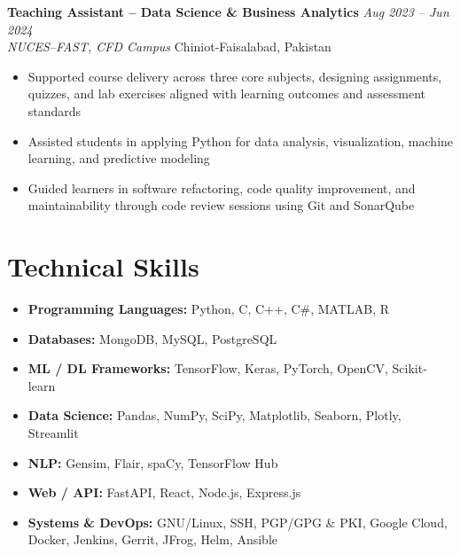 \documentclass[11pt,a4paper]{article}
\newcommand{\entry}[4]{%
  \noindent\textbf{#1} \hfill \textit{#2}\\
  \textit{#3} \hfill #4\\[2pt]
}
\begin{document}
\vspace{4pt}
\entry{Teaching Assistant -- Data Science \& Business Analytics}
      {Aug 2023 -- Jun 2024}{NUCES--FAST, CFD Campus}{Chiniot-Faisalabad, Pakistan}
\begin{itemize}
    \item Supported course delivery across three core subjects, designing assignments, quizzes, and
          lab exercises aligned with learning outcomes and assessment standards
    \item Assisted students in applying Python for data analysis, visualization, machine learning,
          and predictive modeling
    \item Guided learners in software refactoring, code quality improvement, and maintainability
          through code review sessions using Git and SonarQube
\end{itemize}

\section*{Technical Skills}
\begin{itemize}
    \item \textbf{Programming Languages:} Python, C, C++, C\#, MATLAB, R
    \item \textbf{Databases:} MongoDB, MySQL, PostgreSQL
    \item \textbf{ML / DL Frameworks:} TensorFlow, Keras, PyTorch, OpenCV, Scikit-learn
    \item \textbf{Data Science:} Pandas, NumPy, SciPy, Matplotlib, Seaborn, Plotly, Streamlit
    \item \textbf{NLP:} Gensim, Flair, spaCy, TensorFlow Hub
    \item \textbf{Web / API:} FastAPI, React, Node.js, Express.js
    \item \textbf{Systems \& DevOps:} GNU/Linux, SSH, PGP/GPG \& PKI, Google Cloud, Docker, Jenkins,
          Gerrit, JFrog, Helm, Ansible
\end{itemize}

\end{document}
